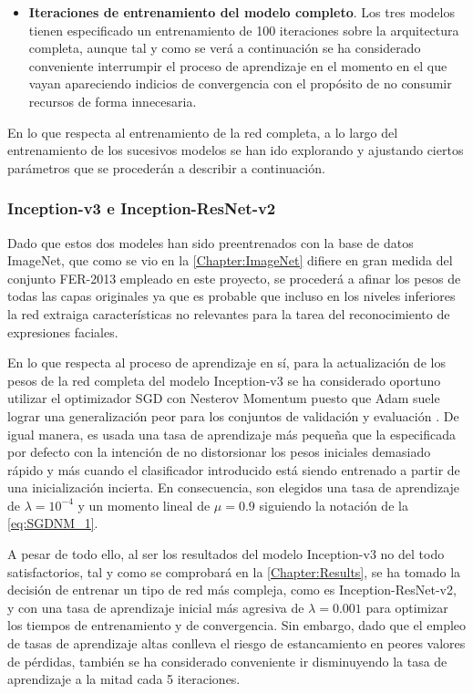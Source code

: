 \begin{itemize}
    \item \textbf{Iteraciones de entrenamiento del modelo completo}. Los tres modelos tienen especificado un entrenamiento de 100 iteraciones sobre la arquitectura completa, aunque tal y como se verá a continuación se ha considerado conveniente interrumpir el proceso de aprendizaje en el momento en el que vayan apareciendo indicios de convergencia con el propósito de no consumir recursos de forma innecesaria.
\end{itemize}

En lo que respecta al entrenamiento de la red completa, a lo largo del entrenamiento de los sucesivos modelos se han ido explorando y ajustando ciertos parámetros que se procederán a describir a continuación.

\subsubsection{Inception-v3 e Inception-ResNet-v2}

Dado que estos dos modeles han sido preentrenados con la base de datos ImageNet, que como se vio en la \autoref{Chapter:ImageNet} difiere en gran medida del conjunto FER-2013 empleado en este proyecto, se procederá a afinar los pesos de todas las capas originales ya que es probable que incluso en los niveles inferiores la red extraiga características no relevantes para la tarea del reconocimiento de expresiones faciales.

En lo que respecta al proceso de aprendizaje en sí, para la actualización de los pesos de la red completa del modelo Inception-v3 se ha considerado oportuno utilizar el optimizador SGD con Nesterov Momentum puesto que Adam suele lograr una generalización peor para los conjuntos de validación y evaluación \cite{AdamToSDG}. De igual manera, es usada una tasa de aprendizaje más pequeña que la especificada por defecto con la intención de no distorsionar los pesos iniciales demasiado rápido y más cuando el clasificador introducido está siendo entrenado a partir de una inicialización incierta. En consecuencia, son elegidos una tasa de aprendizaje de $\lambda = 10^{-4}$ y un momento lineal de $\mu = 0.9$ \cite{Sutskever} siguiendo la notación de la \autoref{eq:SGDNM_1}.

A pesar de todo ello, al ser los resultados del modelo Inception-v3 no del todo satisfactorios, tal y como se comprobará en la \autoref{Chapter:Results}, se ha tomado la decisión de entrenar un tipo de red más compleja, como es Inception-ResNet-v2, y con una tasa de aprendizaje inicial más agresiva de $\lambda = 0.001$ para optimizar los tiempos de entrenamiento y de convergencia. Sin embargo, dado que el empleo de tasas de aprendizaje altas conlleva el riesgo de estancamiento en peores valores de pérdidas, también se ha considerado conveniente ir disminuyendo la tasa de aprendizaje a la mitad cada 5 iteraciones.

